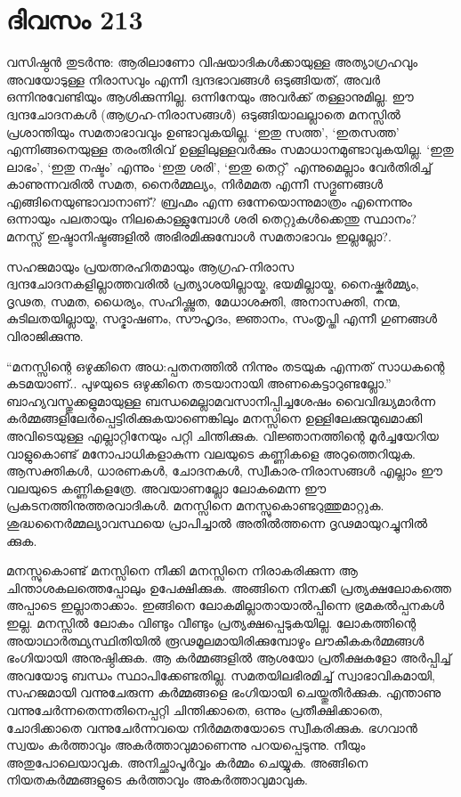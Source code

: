 \section{ദിവസം 213}


വസിഷ്ഠൻ തുടർന്നു: ആരിലാണോ വിഷയാദികൾക്കായുള്ള അത്യാഗ്രഹവും അവയോടുള്ള നിരാസവും എന്നീ ദ്വന്ദഭാവങ്ങൾ ഒടുങ്ങിയത്, അവർ ഒന്നിനുവേണ്ടിയും ആശിക്കുന്നില്ല. ഒന്നിനേയും അവർക്ക് തള്ളാനുമില്ല. ഈ ദ്വന്ദചോദനകൾ (ആഗ്രഹ-നിരാസങ്ങൾ) ഒടുങ്ങിയാലല്ലാതെ മനസ്സിൽ പ്രശാന്തിയും സമതാഭാവവും ഉണ്ടാവുകയില്ല. ‘ഇതു സത്ത’, ‘ഇതസത്ത’ എന്നിങ്ങനെയുള്ള തരംതിരിവ് ഉള്ളിലുള്ളവർക്കും സമാധാനമുണ്ടാവുകയില്ല. ‘ഇതു ലാഭം’, ‘ഇതു നഷ്ടം’ എന്നും ‘ഇതു ശരി’, ‘ഇതു തെറ്റ്’ എന്നുമെല്ലാം വേർതിരിച്ച് കാണുന്നവരിൽ സമത, നൈർമ്മല്യം, നിർമമത എന്നീ സദ്ഗുണങ്ങൾ എങ്ങിനെയുണ്ടാവാനാണ്‌? ബ്രഹ്മം എന്ന ഒന്നേയൊന്നുമാത്രം എന്നെന്നും ഒന്നായും പലതായും നിലകൊള്ളുമ്പോൾ ശരി തെറ്റുകൾക്കെന്തു സ്ഥാനം? മനസ്സ് ഇഷ്ടാനിഷ്ടങ്ങളിൽ അഭിരമിക്കുമ്പോൾ സമതാഭാവം ഇല്ലല്ലോ?.

സഹജമായും പ്രയത്നരഹിതമായും ആഗ്രഹ-നിരാസ ദ്വന്ദചോദനകളില്ലാത്തവരിൽ പ്രത്യാശയില്ലായ്മ, ഭയമില്ലായ്മ, നൈഷ്കർമ്മ്യം, ദൃഢത, സമത, ധൈര്യം, സഹിഷ്ണുത, മേധാശക്തി, അനാസക്തി, നന്മ, കുടിലതയില്ലായ്മ, സദ്ഭാഷണം, സൗഹൃദം, ജ്ഞാനം, സംതൃപ്തി എന്നീ ഗുണങ്ങൾ വിരാജിക്കുന്നു.

“മനസ്സിന്റെ ഒഴുക്കിനെ അധ:പ്പതനത്തിൽ നിന്നും തടയുക എന്നത് സാധകന്റെ കടമയാണ്‌.. പുഴയുടെ ഒഴുക്കിനെ തടയാനായി അണകെട്ടാറുണ്ടല്ലോ.” ബാഹ്യവസ്തുക്കളുമായുള്ള ബന്ധമെല്ലാമവസാനിപ്പിച്ചശേഷം വൈവിദ്ധ്യമാർന്ന കർമ്മങ്ങളിലേർപ്പെട്ടിരിക്കുകയാണെങ്കിലും മനസ്സിനെ ഉള്ളിലേക്കുന്മുഖമാക്കി അവിടെയുള്ള എല്ലാറ്റിനേയും പറ്റി ചിന്തിക്കുക. വിജ്ഞാനത്തിന്റെ മൂർച്ചയേറിയ വാളുകൊണ്ട് മനോപാധികളാകുന്ന വലയുടെ കണ്ണികളെ  അറുത്തെറിയുക. ആസക്തികൾ, ധാരണകൾ, ചോദനകൾ, സ്വീകാര-നിരാസങ്ങൾ എല്ലാം ഈ വലയുടെ കണ്ണികളത്രേ. അവയാണല്ലോ ലോകമെന്ന ഈ പ്രകടനത്തിനുത്തരവാദികൾ. മനസ്സിനെ മനസ്സുകൊണ്ടറുത്തുമാറ്റുക. ശുദ്ധനൈർമ്മല്യാവസ്ഥയെ പ്രാപിച്ചാൽ അതിൽത്തന്നെ ദൃഢമായുറച്ചുനിൽ ക്കുക.

മനസ്സുകൊണ്ട് മനസ്സിനെ നീക്കി മനസ്സിനെ നിരാകരിക്കുന്ന ആ ചിന്താശകലത്തെപ്പോലും ഉപേക്ഷിക്കുക. അങ്ങിനെ നിനക്കീ പ്രത്യക്ഷലോകത്തെ അപ്പാടെ ഇല്ലാതാക്കാം. ഇങ്ങിനെ ലോകമില്ലാതായാല്‍പ്പിന്നെ ഭ്രമകൽപ്പനകൾ ഇല്ല. മനസ്സിൽ ലോകം വിണ്ടും വീണ്ടും പ്രത്യക്ഷപ്പെടുകയില്ല. ലോകത്തിന്റെ അയാഥാർത്ഥ്യസ്ഥിതിയിൽ രൂഢമൂലമായിരിക്കുമ്പോഴും ലൗകീകകർമ്മങ്ങൾ ഭംഗിയായി അനുഷ്ഠിക്കുക. ആ കർമ്മങ്ങളിൽ ആശയോ പ്രതീക്ഷകളോ അർപ്പിച്ച് അവയോടു ബന്ധം സ്ഥാപിക്കേണ്ടതില്ല. സമതയിലഭിരമിച്ച് സ്വാഭാവികമായി, സഹജമായി വന്നുചേരുന്ന കർമ്മങ്ങളെ ഭംഗിയായി ചെയ്തുതീർക്കുക. എന്താണു വന്നുചേർന്നതെന്നതിനെപ്പറ്റി ചിന്തിക്കാതെ, ഒന്നും പ്രതീക്ഷിക്കാതെ, ചോദിക്കാതെ വന്നുചേർന്നവയെ നിർമമതയോടെ സ്വീകരിക്കുക. ഭഗവാൻ സ്വയം കർത്താവും അകർത്താവുമാണെന്നു പറയപ്പെടുന്നു. നീയും അതുപോലെയാവുക. അനിച്ഛാപൂർവ്വം കർമ്മം ചെയ്യുക. അങ്ങിനെ നിയതകർമ്മങ്ങളുടെ കർത്താവും അകർത്താവുമാവുക. 

